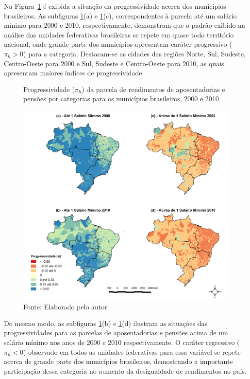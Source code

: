Na Figura~\ref{fig:cap04:progcidades} é exibida a situação da progressividade acerca dos municípios brasileiros. As subfiguras \ref{fig:cap04:progcidades}(a) e \ref{fig:cap04:progcidades}(c), correspondentes à parcela até um salário mínimo para 2000 e 2010, respectivamente, demonstram que o padrão exibido na análise das unidades federativas brasileiras se repete em quase todo território nacional, onde grande parte dos municípios apresentam caráter progressivo ($\pi_h > 0$) para a categoria. Destacam-se as cidades das regiões Norte, Sul, Sudeste, Centro-Oeste para 2000 e Sul, Sudeste e Centro-Oeste para 2010, as quais apresentam maiores índices de progressividade.

\begin{figure}[!ht]
    \centering
    \caption{Progressividade ($\pi_h$) da parcela de rendimentos de aposentadorias e pensões por categorias para os municípios brasileiros, 2000 e 2010}
    \includegraphics[width=\textwidth]{figs/cap04_mapa_prog_cidades.png}
    \caption*{\footnotesize{Fonte: Elaborado pelo autor}}
    \label{fig:cap04:progcidades}
\end{figure}

Do mesmo modo, as subfiguras \ref{fig:cap04:progcidades}(b) e \ref{fig:cap04:progcidades}(d) ilustram as situações das progressividades para as parcelas de aposentadorias e pensões acima de um salário mínimo nos anos de 2000 e 2010 respectivamente. O caráter regressivo ($\pi_h < 0$) observado em todos as unidades federativas para essa variável se repete acerca de grande parte dos municípios brasileiros, demostrando a importante participação dessa categoria no aumento da desigualdade de rendimentos no país.

